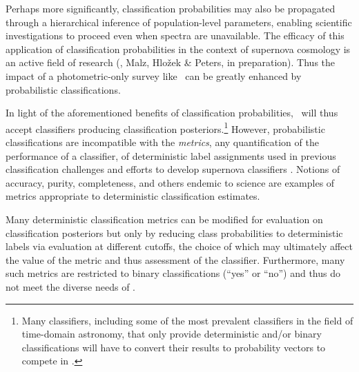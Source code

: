 Perhaps more significantly, classification probabilities may also be propagated through a hierarchical inference of population-level parameters, enabling scientific investigations to proceed even when spectra are unavailable.
The efficacy of this application of classification probabilities in the context of supernova cosmology is an active field of research (\citet{roberts_zbeams:_2017}, Malz, Hlo\v{z}ek \& Peters, in preparation).
Thus the impact of a photometric-only survey like \lsst\ can be greatly enhanced by probabilistic classifications.

In light of the aforementioned benefits of classification probabilities, \plasticc\ will thus accept classifiers producing classification posteriors.\footnote{Many classifiers, including some of the most prevalent classifiers in the field of time-domain astronomy, that only provide deterministic and/or binary classifications will have to convert their results to probability vectors to compete in \plasticc.}
However, probabilistic classifications are incompatible with the \textit{metrics}, any quantification of the performance of a classifier, of deterministic label assignments used in previous classification challenges \citep{kessler_supernova_2010, kessler_results_2010} and efforts to develop supernova classifiers \citep{narayan_machine_2018}.
Notions of accuracy, purity, completeness, and others endemic to science are examples of metrics appropriate to deterministic classification estimates.

Many deterministic classification metrics can be modified for evaluation on classification posteriors \citep{lochner_photometric_2016, moller_photometric_2016, hon_deep_2017, hon_detecting_2018, gieseke_detecting_2010} but only by reducing class probabilities to deterministic labels via evaluation at different cutoffs, the choice of which may ultimately affect the value of the metric and thus assessment of the classifier.
Furthermore, many such metrics are restricted to binary classifications (``yes'' or ``no'') and thus do not meet the diverse needs of \plasticc.


